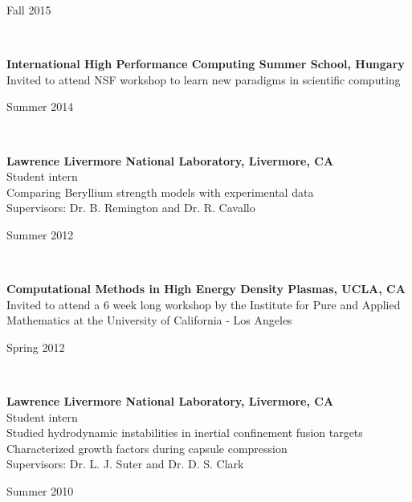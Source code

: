 \documentclass[11pt,letterpaper]{article}
\begin{document}
\begin{minipage}[t]{0.15\textwidth}\flushright%
  Fall 2015%
\end{minipage}\\[2ex]%
\begin{minipage}[t]{0.82\textwidth}%
  \textbf{International High Performance Computing Summer School, Hungary}\\%
  Invited to attend NSF workshop to learn new paradigms in scientific computing%
\end{minipage}\hfill%
\begin{minipage}[t]{0.15\textwidth}\flushright%
  Summer 2014%
\end{minipage}\\[2ex]%
\begin{minipage}[t]{0.82\textwidth}%
  \textbf{Lawrence Livermore National Laboratory, Livermore, CA}\\%
  Student intern\\%
  Comparing Beryllium strength models with experimental data\\%
  Supervisors: Dr. B. Remington and Dr. R. Cavallo%
\end{minipage}\hfill%
\begin{minipage}[t]{0.15\textwidth}\flushright%
  Summer 2012%
\end{minipage}\\[2ex]%
\begin{minipage}[t]{0.82\textwidth}%
  \textbf{Computational Methods in High Energy Density Plasmas, UCLA, CA}\\%
  Invited to attend a 6 week long workshop by the Institute for Pure and Applied Mathematics at the University of California - Los Angeles%
\end{minipage}\hfill%
\begin{minipage}[t]{0.15\textwidth}\flushright%
  Spring 2012%
\end{minipage}\\[2ex]%
\begin{minipage}[t]{0.82\textwidth}%
  \textbf{Lawrence Livermore National Laboratory, Livermore, CA}\\%
  Student intern\\%
  Studied hydrodynamic instabilities in inertial confinement fusion targets\\%
  Characterized growth factors during capsule compression\\%
  Supervisors: Dr. L. J. Suter and Dr. D. S. Clark%
\end{minipage}\hfill%
\begin{minipage}[t]{0.15\textwidth}\flushright%
  Summer 2010%
\end{minipage}\\[2ex]%
\end{document}
